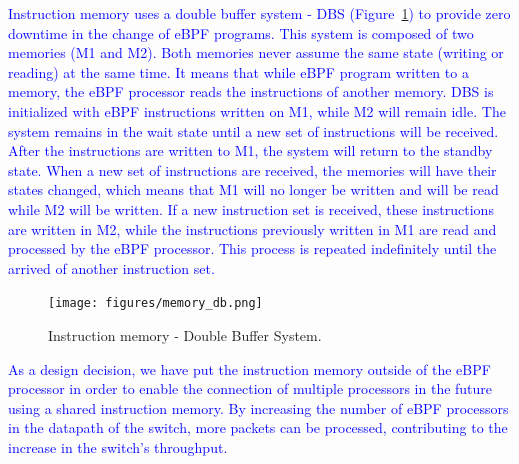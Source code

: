 \textcolor{blue}{Instruction memory uses a double buffer system - DBS (Figure~\ref{fig:mem_db}) to provide zero downtime in the change of eBPF programs. This system is composed of two memories (M1 and M2). Both memories never assume the same state (writing or reading) at the same time. It means that while eBPF program written to a memory, the eBPF processor reads the instructions of another memory. DBS is initialized with eBPF instructions written on M1, while M2 will remain idle. The system remains in the wait state until a new set of instructions will be received. After the instructions are written to M1, the system will return to the standby state. When a new set of instructions are received, the memories will have their states changed, which means that M1 will no longer be written and will be read while M2 will be written. If a new instruction set is received, these instructions are written in M2, while the instructions previously written in M1 are read and processed by the eBPF processor. This process is repeated indefinitely until the arrived of another instruction set.} 

\begin{figure}[ht]
\centering
\texttt{[image: figures/memory\_db.png]}
\caption{Instruction memory - Double Buffer System.}
\label{fig:mem_db}
\end{figure}

\textcolor{blue}{As a design decision, we have put the instruction memory outside of the eBPF processor in order to enable the connection of multiple processors in the future using a shared instruction memory. By increasing the number of eBPF processors in the datapath of the switch, more packets can be processed, contributing to the increase in the switch's throughput.}


